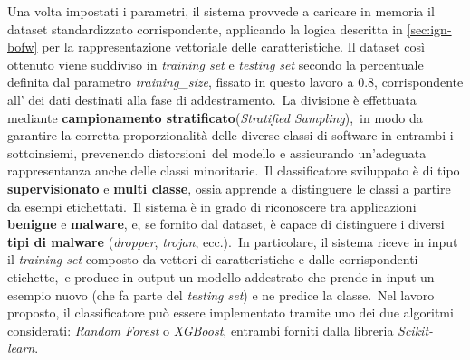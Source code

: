 Una volta impostati i parametri, il sistema provvede a caricare in memoria il dataset standardizzato corrispondente, applicando la logica descritta in \autoref{sec:ign-bofw} per la rappresentazione
vettoriale delle caratteristiche.
Il dataset così ottenuto viene suddiviso in \textit{training set} e \textit{testing set} secondo la percentuale definita dal parametro \textit{training\_size},
fissato in questo lavoro a $0.8$, corrispondente all' dei dati destinati alla fase di addestramento.\
La divisione è effettuata mediante \textbf{campionamento stratificato}(\textit{Stratified Sampling}),\
in modo da garantire la corretta proporzionalità delle diverse classi di software in entrambi i sottoinsiemi, prevenendo distorsioni\
del modello e assicurando un'adeguata rappresentanza anche delle classi minoritarie.\
Il classificatore sviluppato è di tipo \textbf{supervisionato} e \textbf{multi classe}, ossia apprende a distinguere le classi a partire da esempi etichettati.\
Il sistema è in grado di riconoscere tra applicazioni \textbf{benigne} e \textbf{malware}, e, se fornito dal dataset, è capace di distinguere i diversi \textbf{tipi di
    malware} (\textit{dropper}, \textit{trojan}, ecc.).\
In particolare, il sistema riceve in input il \textit{training set} composto da vettori di caratteristiche e dalle corrispondenti etichette,\
e produce in output un modello addestrato che prende in input un esempio nuovo (che fa parte del  \textit{testing set}) e ne predice la classe.\
Nel lavoro proposto, il classificatore può essere implementato tramite uno dei due algoritmi considerati: \textit{Random Forest} o \textit{XGBoost},
entrambi forniti dalla libreria \textit{Scikit-learn}\mycite{scikit-learn}.